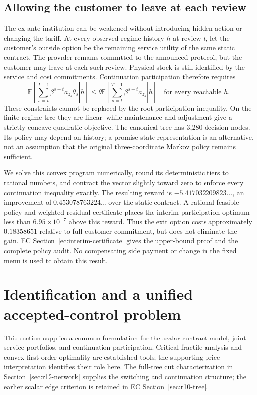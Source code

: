 \documentclass[11pt,letterpaper]{article}
\theoremstyle{definition}
\newcommand{\E}{\mathbb E}
\newcommand{\1}{\mathbf 1}
\begin{document}
\subsection{Allowing the customer to leave at each review}\label{sec:interim}
The ex ante institution can be weakened without introducing hidden action or changing the tariff. At every observed regime history $h$ at review $t$, let the customer's outside option be the remaining service utility of the same static contract. The provider remains committed to the announced protocol, but the customer may leave at each such review. Physical stock is still identified by the service and cost commitments. Continuation participation therefore requires
\begin{equation}\label{eq:interim}
 \E\left[\left.\sum_{s=t}^{T-1}\beta^{s-t}a_{z_s}\theta_s\right|h\right]
 \leq\bar\theta\E\left[\left.\sum_{s=t}^{T-1}\beta^{s-t}a_{z_s}\right|h\right]
 \quad\text{for every reachable }h.
\end{equation}
These constraints cannot be replaced by the root participation inequality. On the finite regime tree they are linear, while maintenance and adjustment give a strictly concave quadratic objective. The canonical tree has 3,280 decision nodes. Its policy may depend on history; a promise-state representation is an alternative, not an assumption that the original three-coordinate Markov policy remains sufficient.

We solve this convex program numerically, round its deterministic tiers to rational numbers, and contract the vector slightly toward zero to enforce every continuation inequality exactly. The resulting reward is $-5.417032209823\ldots$, an improvement of $0.453078763224\ldots$ over the static contract. A rational feasible-policy and weighted-residual certificate places the interim-participation optimum less than $6.95\times10^{-7}$ above this reward. Thus the exit option costs approximately $0.18358651$ relative to full customer commitment, but does not eliminate the gain. EC Section~\ref{ec:interim-certificate} gives the upper-bound proof and the complete policy audit. No compensating side payment or change in the fixed menu is used to obtain this result.



\section{Identification and a unified accepted-control problem}\label{sec:r10-general}
This section supplies a common formulation for the scalar contract model, joint service portfolios, and continuation participation. Critical-fractile analysis and convex first-order optimality are established tools; the supporting-price interpretation identifies their role here. The full-tree cut characterization in Section~\ref{sec:r12-network} supplies the switching and continuation structure; the earlier scalar edge criterion is retained in EC Section~\ref{sec:r10-tree}.
\end{document}
